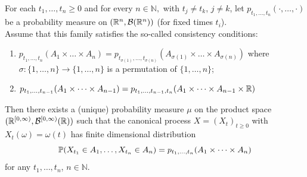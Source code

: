 \begin{ThBox}
    \begin{Th}
    For each $t_1, \dots, t_n \geq 0$ and for every $n \in \mathbb{N}, $ with $t_j \neq t_k$, $j \neq k$, let $p_{t_1, \dots, t_n}(\cdot, \dots, \cdot)$ be a probability measure on $(\mathbb{R}^n, \mathcal{B}(\mathbb{R}^n))$ (for fixed times $t_i$). \\
    Assume that this family satisfies the so-called consistency conditions:
    \begin{enumerate}
        \item $p_{t_1, \dots, t_n}(A_1 \times  \dots \times  A_n) = p_{t_{\sigma(1)}, \dots, t_{\sigma(n)}}(A_{\sigma(1)} \times  \dots \times  A_{\sigma(n)})$ where $\sigma:\{1, \dots, n\} \to \{1, \dots, n\} $ is a permutation of $\{1, \ldots, n\}$;
        \item $p_{t_1, \dots, t_{n-1}}(A_1\times  \dots \times  A_{n-1}) =p_{t_1, \dots, t_{n-1}, t_n}(A_1\times  \dots \times  A_{n-1}\times \mathbb{R}) $
    \end{enumerate}
    Then there exists a (unique) probability measure $\mu$ on the product space $(\mathbb{R}^{[0,\infty)}, \mathcal{B}^{[0,\infty)}(\mathbb{R}))$ such that the canonical process $X=(X_t)_{t \geq 0}$ with $X_t(\omega)= \omega(t)$ has finite dimensional distribution 
    \begin{equation*}
        \mathbb{P}(X_{t_1}\in A_1, \dots, X_{t_n} \in A_n)= p_{t_1, \dots, t_n}(A_1 \times \dots \times  A_n)
    \end{equation*}
    for any $t_1, \dots, t_n$, $n \in \mathbb{N}$.
\end{Th}
\end{ThBox}

